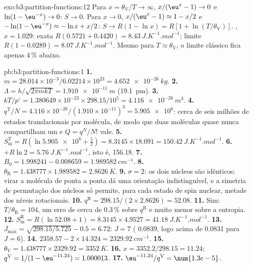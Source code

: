\begin{solution}{exo:b3:partition-functions:12}
Para $x = \theta_{\mathrm V}/T \to \infty$, $x/(\eu^x - 1) \to 0$ e $\ln(1 - \eu^{-x}) \to 0$: $S \to 0$. Para $x \to 0$,
$x/(\eu^x - 1) \approx 1 - x/2$ e $-\ln(1 - \eu^{-x}) \approx -\ln x + x/2$: $S \to R(1 - \ln x) = R[1 + \ln(T/\theta_{\mathrm V})]$.
, $x = 1.029$: exata $R(0.5721 + 0.4420) = \qty{8.43}{J.K^{-1}.mol^{-1}}$; limite $R(1 - 0.0289) =
\qty{8.07}{J.K^{-1}.mol^{-1}}$. Mesmo para $T \approx \theta_{\mathrm V}$, o limite clássico fica apenas 4\,\% abaixo.
\end{solution}

\begin{solution}{pb:b3:partition-functions:1}
\textbf{1.} $m = 28.014\times10^{-3}/6.02214\times10^{23} = \qty{4.652e-26}{kg}$.
\textbf{2.} $\Lambda = h/\sqrt{2\pi mkT} = \qty{1.910e-11}{m}$ (\qty{19.1}{pm}).
\textbf{3.} $kT/p^\circ = 1.380649\times10^{-23} \times 298.15/10^5 = \qty{4.116e-26}{m^3}$.
\textbf{4.} $q^{\mathrm T}/N = 4.116\times10^{-26}/(1.910\times10^{-11})^3 = \num{5.905e6}$: cerca de seis milhões
de estados translacionais por molécula, de modo que duas moléculas quase nunca
compartilham um e $Q = q^N/N!$ vale.
\textbf{5.} $S^{\mathrm T}_{\mathrm m} = R(\ln\num{5.905e6} + \frac52) = 8.3145 \times 18.091 = \qty{150.42}{J.K^{-1}.mol^{-1}}$.
\textbf{6.} $+R\ln2 = \qty{5.76}{J.K^{-1}.mol^{-1}}$, isto é, \num{156.18}.
\textbf{7.} $B_0 = 1.998241 - 0.008659 = \qty{1.989582}{cm^{-1}}$.
\textbf{8.} $\theta_{\mathrm R} = 1.438777 \times 1.989582 = \qty{2.8626}{K}$.
\textbf{9.} $\sigma = 2$: os dois núcleos são idênticos; virar a molécula de ponta a
ponta dá uma orientação indistinguível, e a simetria de permutação dos núcleos
só permite, para cada estado de spin nuclear, metade dos níveis rotacionais.
\textbf{10.} $q^{\mathrm R} = 298.15/(2 \times 2.8626) = 52.08$.
\textbf{11.} Sim: $T/\theta_{\mathrm R} = 104$, um erro de cerca de 0.3\,\% sobre $q^{\mathrm R}$ e muito
menor sobre a entropia.
\textbf{12.} $S^{\mathrm R}_{\mathrm m} = R(\ln52.08 + 1) = 8.3145 \times 4.9527 = \qty{41.18}{J.K^{-1}.mol^{-1}}$.
\textbf{13.} $J_{\max} = \sqrt{298.15/5.725} - 0.5 = 6.72$: $J = 7$ ( 0.0839, logo acima de
0.0831 para $J = 6$).
\textbf{14.} $2358.57 - 2 \times 14.324 = \qty{2329.92}{cm^{-1}}$.
\textbf{15.} $\theta_{\mathrm V} = 1.438777 \times 2329.92 = \qty{3352}{K}$.
\textbf{16.} $x = 3352.2/298.15 = 11.24$; $q^{\mathrm V} = 1/(1 - \eu^{-11.24}) = 1.000013$.
\textbf{17.} $\eu^{-11.24}/q^{\mathrm V} = \num{1.3e-5}$.

\end{solution}
